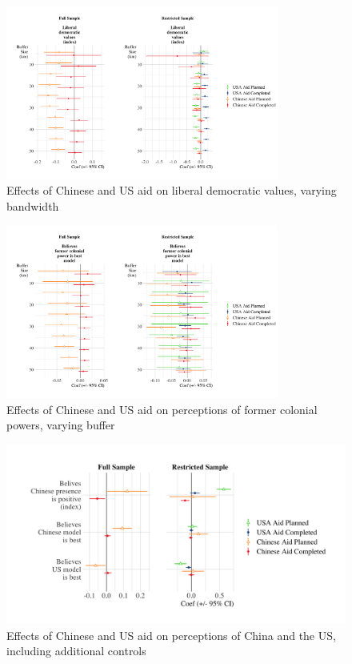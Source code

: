 \documentclass[9pt]{article}
\begin{document}
\begin{figure}[H]
\centering
\includegraphics[width=0.8\textwidth]{figures/figure_a11.png} %
\caption{Effects of Chinese and US aid on liberal democratic values, varying bandwidth}
\end{figure}

\begin{figure}[H]
\centering
\includegraphics[width=0.8\textwidth]{figures/figure_a12.png} %
\caption{Effects of Chinese and US aid on perceptions of former colonial powers, varying buffer}
\end{figure}

\begin{figure}[H]
\centering
\includegraphics[width=1\textwidth]{figures/figure_a13.png} %
\caption{Effects of Chinese and US aid on perceptions of China and the US, including additional controls}
\end{figure}
\end{document}
